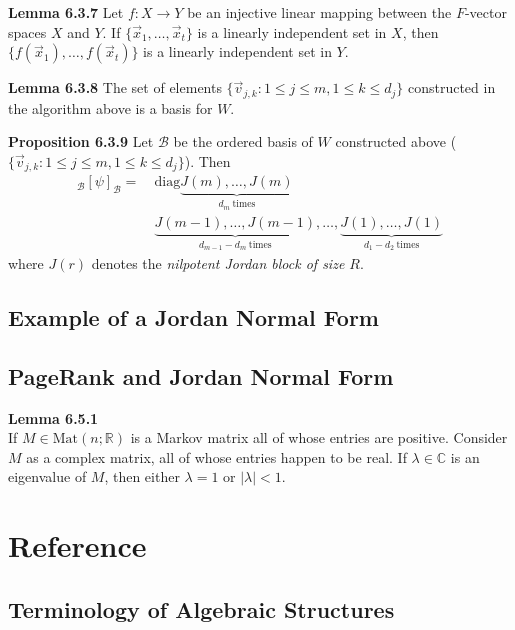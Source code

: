 \documentclass[8pt,landscape]{article}
\begin{document}
\begin{multicols}{3}
    \textbf{Lemma 6.3.7}
    Let $f : X \to Y$ be an injective linear mapping between the $F$-vector spaces $X$
    and $Y$.
    If $\{ \vec{x}_1, \ldots, \vec{x}_t \}$ is a linearly independent set in $X$,
    then $\{ f(\vec{x}_1), \ldots, f(\vec{x}_t) \}$
    is a linearly independent set in $Y$.

    \textbf{Lemma 6.3.8}
    The set of elements $\{ \vec{v}_{j, k} : 1 \leq j \leq m, 1 \leq k \leq d_j \}$
    constructed in the algorithm above is a basis for $W$.

    \textbf{Proposition 6.3.9}
    Let $\mathcal{B}$ be the ordered basis of $W$ constructed above
    ($\{ \vec{v}_{j, k} : 1 \leq j \leq m, 1 \leq k \leq d_j \}$).
    Then
    \begin{align*}{}
        _\mathcal{B} {[\psi]}_\mathcal{B} = \
            &\mathrm{diag} \underbrace{J(m), \ldots, J(m)}_{d_m \ \text{times}} \\
            &\underbrace{J(m-1), \ldots, J(m-1)}_{d_{m-1} - d_m \ \text{times}}, \ldots,
            \underbrace{J(1), \ldots, J(1)}_{d_1 - d_2 \ \text{times}}
    \end{align*}
    where $J(r)$ denotes the \emph{nilpotent Jordan block of size $R$}.

    \subsection{Example of a Jordan Normal Form}

    \subsection{PageRank and Jordan Normal Form}

    \textbf{Lemma 6.5.1} \\
    If $M \in \mathrm{Mat}(n; \mathbb{R})$ is a Markov matrix all of whose entries are
    positive.
    Consider $M$ as a complex matrix, all of whose entries happen to be real.
    If $\lambda \in \mathbb{C}$ is an eigenvalue of $M$, then either $\lambda = 1$
    or $|\lambda| < 1$.

    \section{Reference}

    \subsection{Terminology of Algebraic Structures}


\end{multicols}
\end{document}
